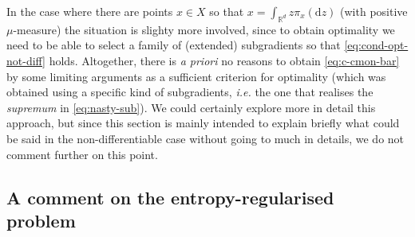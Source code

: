 \documentclass[leqno, 11pt, a4paper]{amsart}
\theoremstyle{definition}
\newcommand{\R}{\mathbb{R}}
\newcommand{\dd}{\mathrm{d}}
\begin{document}
    In the case where there are points $x \in X$ so that $x = \int_{\R^d} z \pi_x(\dd z)$ (with positive $\mu$-measure) the situation is slighty more involved, since to obtain optimality we need to be able to select a family of (extended) subgradients so that \eqref{eq:cond-opt-not-diff} holds. Altogether, there is \textit{a priori} no reasons to obtain \eqref{eq:c-cmon-bar} by some limiting arguments as a sufficient criterion for optimality (which was obtained using a specific kind of subgradients, \textit{i.e.} the one that realises the \textit{supremum} in \eqref{eq:nasty-sub}). We could certainly explore more in detail this approach, but since this section is mainly intended to explain briefly what could be said in the non-differentiable case without going to much in details, we do not comment further on this point.
    


\subsection{A comment on the entropy-regularised problem}
\end{document}
